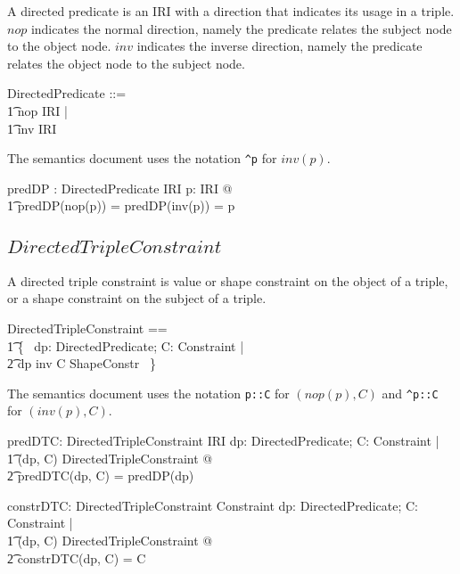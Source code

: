 \documentclass{article}
\begin{document}
A directed predicate is an IRI with a direction that indicates its usage in a triple. 
$nop$ indicates the normal direction, namely the predicate relates the subject node to the object node. 
$inv$ indicates the inverse direction, namely the predicate relates the object node to the subject node.
\begin{zed}
	DirectedPredicate ::= \\
\t1		nop \ldata IRI \rdata | \\
\t1		inv \ldata IRI \rdata
\end{zed}

The semantics document uses the notation {\tt \verb+^+p} for $inv(p)$.

\begin{axdef}
	predDP : DirectedPredicate \fun IRI
\where
	\forall p: IRI @ \\
\t1		predDP(nop(p)) = predDP(inv(p)) = p
\end{axdef}

\subsection{$DirectedTripleConstraint$}
A directed triple constraint is value or shape constraint on the object of a triple, or a shape constraint on the subject of a triple.
\begin{zed}
	DirectedTripleConstraint == \\
\t1		\{~ dp: DirectedPredicate; C: Constraint | \\
\t2			dp \in \ran inv \implies C \in ShapeConstr ~\}
\end{zed}

The semantics document uses the notation {\tt p::C} for $(nop(p),C)$ and {\tt \verb+^+p::C} for $(inv(p),C)$.

\begin{axdef}
	predDTC: DirectedTripleConstraint \fun IRI
\where
	\forall dp: DirectedPredicate; C: Constraint | \\
\t1		(dp, C) \in DirectedTripleConstraint @ \\
\t2			predDTC(dp, C) = predDP(dp)
\end{axdef}

\begin{axdef}
	constrDTC: DirectedTripleConstraint \fun Constraint
\where
	\forall dp: DirectedPredicate; C: Constraint | \\
\t1		(dp, C) \in DirectedTripleConstraint @ \\
\t2			constrDTC(dp, C) = C
\end{axdef}
\end{document}
